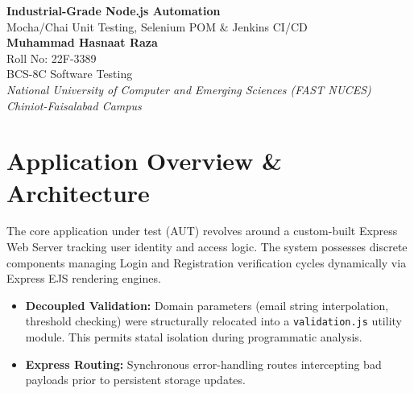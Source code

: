 \documentclass[11pt, a4paper]{article}
\begin{document}
\begin{center}
    \vspace*{1cm}
    {\huge\bfseries\color{PrimaryColor} Industrial-Grade Node.js Automation}\\[0.5cm]
    {\Large Mocha/Chai Unit Testing, Selenium POM \& Jenkins CI/CD}\\[1cm]
    
    \textbf{Muhammad Hasnaat Raza} \\
    Roll No: 22F-3389 \\
    BCS-8C Software Testing \\[0.5cm]
    
    \textit{National University of Computer and Emerging Sciences (FAST NUCES)} \\
    \textit{Chiniot-Faisalabad Campus} \\
    \vspace{0.5cm}
\end{center}

\vspace{1cm}

\begin{abstract}
\noindent This document outlines the implementation of a full-stack authentication system engineered using Node.js and Express. It presents a comprehensive, modular test architecture applying the Page Object Model (POM) pattern for End-to-End (E2E) testing via Selenium WebDriver, coupled with granular unit testing utilizing Mocha and Chai. Furthermore, the report details the orchestration of this testing framework through an automated Declarative Jenkins CI/CD pipeline, ensuring industrial-quality deployment verifications, regression checks, and automated reporting functionality via Mochawesome.
\end{abstract}

\vspace{0.5cm}

\section{Application Overview \& Architecture}
The core application under test (AUT) revolves around a custom-built Express Web Server tracking user identity and access logic. The system possesses discrete components managing Login and Registration verification cycles dynamically via Express EJS rendering engines.
\begin{itemize}
    \item \textbf{Decoupled Validation:} Domain parameters (email string interpolation, threshold checking) were structurally relocated into a \texttt{validation.js} utility module. This permits statal isolation during programmatic analysis.
    \item \textbf{Express Routing:} Synchronous error-handling routes intercepting bad payloads prior to persistent storage updates.
\end{itemize}
\end{document}
